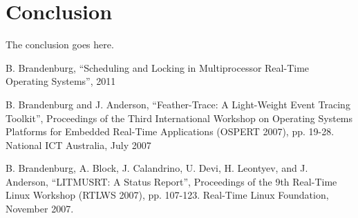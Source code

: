 \documentclass[conference]{IEEEtran}
\begin{document}
\section{Conclusion}
The conclusion goes here.

\begin{thebibliography}{1}

B. Brandenburg, “Scheduling and Locking in Multiprocessor Real-Time Operating Systems”, 2011

B. Brandenburg and J. Anderson, “Feather-Trace: A Light-Weight Event Tracing Toolkit”, Proceedings of the Third International Workshop on Operating Systems Platforms for Embedded Real-Time Applications (OSPERT 2007), pp. 19-28. National ICT Australia, July 2007

B. Brandenburg, A. Block, J. Calandrino, U. Devi, H. Leontyev, and J. Anderson, “LITMUSRT: A Status Report”, Proceedings of the 9th Real-Time Linux Workshop (RTLWS 2007), pp. 107-123. Real-Time Linux Foundation, November 2007.

\end{thebibliography}




\end{document}
